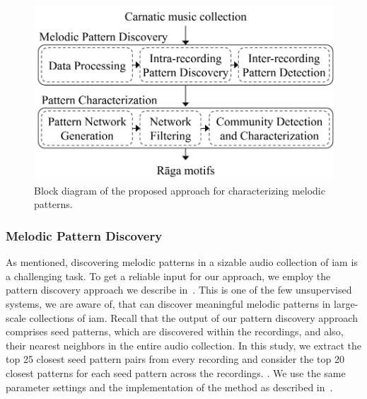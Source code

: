 \begin{figure}
	\begin{center}
		\includegraphics[width=\figSizeHundred]{ch06_patterns/figures/Characterization/blockDiagram.pdf}
	\end{center}
	\caption{Block diagram of the proposed approach for characterizing melodic patterns.}
	\label{fig:block_diagram_characterization}
\end{figure}


\subsubsection{Melodic Pattern Discovery}
\label{sec:patterns_characterization_pattern_discovery}

As mentioned, discovering melodic patterns in a sizable audio collection of \gls{iam} is a challenging task. To get a reliable input for our approach, we employ the pattern discovery approach we describe in~. This is one of the few unsupervised systems, we are aware of, that can discover meaningful melodic patterns in large-scale collections of \gls{iam}. Recall that the output of our pattern discovery approach comprises seed patterns, which are discovered within the recordings, and also, their nearest neighbors in the entire audio collection. In this study, we extract the top 25 closest seed pattern pairs from every recording and consider the top 20 closest patterns for each seed pattern across the recordings. . We use the same parameter settings and the implementation of the method as described in~. 

